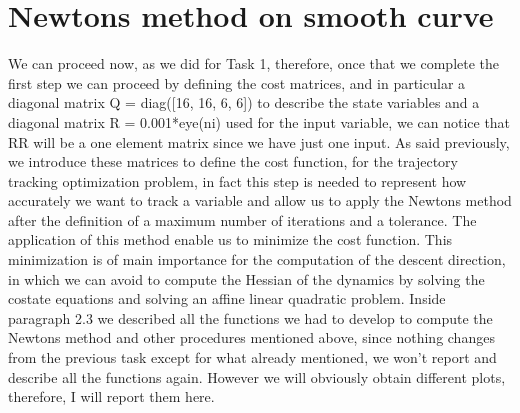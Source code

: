 \documentclass[a4paper,11pt,oneside]{book}
\begin{document}
\section{Newton\textquotesingle s method on smooth curve}
\begin{justify}
    {We can proceed now, as we did for Task 1, therefore, once that we complete the first step we can proceed by defining the cost matrices, and in particular a diagonal matrix Q = diag([16, 16, 6, 6]) to describe the state variables and a diagonal matrix R = 0.001*eye(ni) used for the input variable, we can notice that RR will be a one element matrix since we have just one input. As said previously, we introduce these matrices to define the cost function, for the trajectory tracking optimization problem, in fact this step is needed to represent how accurately we want to track a variable and allow us to apply the Newton\textquotesingle s method after the definition of a maximum number of iterations and a tolerance. The application of this method enable us to minimize the cost function. This minimization is of main importance for the computation of the descent direction, in which we can avoid to compute the Hessian of the dynamics by solving the costate equations and solving an affine linear quadratic problem. Inside paragraph 2.3 we described all the functions we had to develop to compute the Newton\textquotesingle s method and other procedures mentioned above, since nothing changes from the previous task except for what already mentioned, we won't report and describe all the functions again. However we will obviously obtain different plots, therefore, I will report them here.}
\end{justify}

\clearpage
\end{document}
